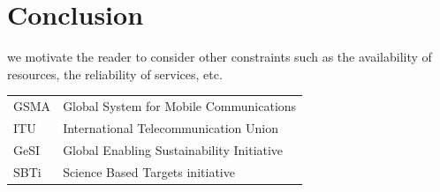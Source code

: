 \documentclass[twocolumn]{article}
\begin{document}
\section{Conclusion}
we motivate the reader to consider other constraints such as the availability of resources, the reliability of services, etc.\\

\begin{tabular}{l@{$\dots\dots$}p{10cm}}
GSMA\dotfill&Global System for Mobile Communications \\
ITU\dotfill&International Telecommunication Union\\
GeSI\dotfill&Global Enabling Sustainability Initiative\\
SBTi\dotfill&Science Based Targets initiative\\
\end{tabular}



\end{document}
